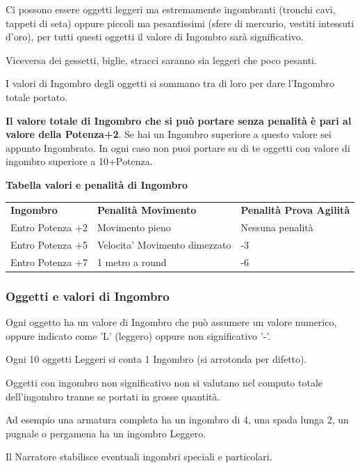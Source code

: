 \documentclass[a4paper,11pt,twoside,openany]{book}
\begin{document}
Ci possono essere oggetti leggeri ma estremamente ingombranti (tronchi cavi, tappeti di seta) oppure piccoli ma pesantissimi (sfere di mercurio, vestiti intessuti d'oro), per tutti questi oggetti il valore di Ingombro sarà significativo.

Viceversa dei gessetti, biglie, stracci saranno sia leggeri che poco pesanti.

I valori di Ingombro degli oggetti si sommano tra di loro per dare l'Ingombro totale portato.

\textbf{Il valore totale di Ingombro che si può portare senza penalità è pari al valore della Potenza+2}.
Se hai un Ingombro superiore a questo valore sei appunto Ingombrato. In ogni caso non puoi portare su di te oggetti con valore di ingombro superiore a 10+Potenza.

\bigskip

\textbf{Tabella valori e penalità di Ingombro}

\medskip

\begin{tabular}{lll}
	\hline
	\textbf{Ingombro} & \textbf{ Penalità Movimento}  & \textbf{Penalità Prova Agilità} \\
	Entro Potenza +2  & Movimento pieno               & Nessuna penalità\\
	Entro Potenza +5  & Velocita' Movimento dimezzato & -3              \\
	Entro Potenza +7  & 1 metro a round               & -6              \\
\end{tabular}

\subsubsection{Oggetti e valori di Ingombro}

Ogni oggetto ha un valore di Ingombro che può assumere un valore numerico, oppure indicato come 'L' (leggero) oppure non significativo '-'.

Ogni 10 oggetti Leggeri si conta 1 Ingombro (si arrotonda per difetto).

Oggetti con ingombro non significativo non si valutano nel computo totale dell'ingombro tranne se portati in grosse quantità.

Ad esempio una armatura completa ha un ingombro di 4, una spada lunga 2, un pugnale o pergamena ha un ingombro Leggero.

Il Narratore stabilisce eventuali ingombri speciali e particolari.
\end{document}
